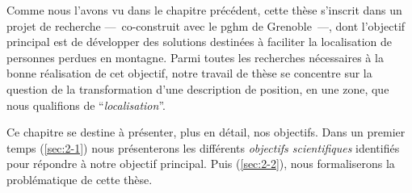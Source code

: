 Comme nous l'avons vu dans le chapitre précédent, cette thèse
s'inscrit dans un projet de recherche ---~co-construit avec le
\ac{pghm} de Grenoble~---, dont l'objectif principal est de développer
des solutions destinées à faciliter la localisation de personnes
perdues en montagne. Parmi toutes les recherches nécessaires à la
bonne réalisation de cet objectif, notre travail de thèse se concentre
sur la question de la transformation d'une description de position, en
une zone, que nous qualifions de \enquote{\emph{localisation}}.

Ce chapitre se destine à présenter, plus en détail, nos
objectifs. Dans un premier temps (\autoref{sec:2-1}) nous présenterons
les différents \emph{objectifs scientifiques} identifiés pour répondre
à notre objectif principal. Puis (\autoref{sec:2-2}), nous
formaliserons la problématique de cette thèse.

